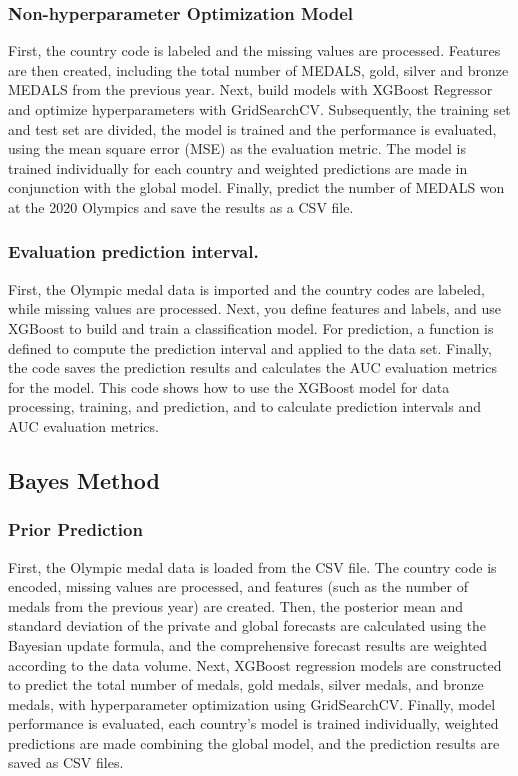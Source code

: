 \documentclass{mcmthesis}
\begin{document}
 \subsubsection{Non-hyperparameter Optimization Model} 
 First, the country code is labeled and the missing values are processed. Features are then created, including the total number of MEDALS, gold, silver and bronze MEDALS from the previous year. Next, build models with XGBoost Regressor and optimize hyperparameters with GridSearchCV. Subsequently, the training set and test set are divided, the model is trained and the performance is evaluated, using the mean square error (MSE) as the evaluation metric. The model is trained individually for each country and weighted predictions are made in conjunction with the global model. Finally, predict the number of MEDALS won at the 2020 Olympics and save the results as a CSV file.
 \subsubsection{Evaluation prediction interval.} 
 First, the Olympic medal data is imported and the country codes are labeled, while missing values are processed. Next, you define features and labels, and use XGBoost to build and train a classification model. For prediction, a function is defined to compute the prediction interval and applied to the data set. Finally, the code saves the prediction results and calculates the AUC evaluation metrics for the model. This code shows how to use the XGBoost model for data processing, training, and prediction, and to calculate prediction intervals and AUC evaluation metrics.
 \subsection{Bayes Method} 
 \subsubsection{Prior Prediction} 
 First, the Olympic medal data is loaded from the CSV file. The country code is encoded, missing values are processed, and features (such as the number of medals from the previous year) are created. Then, the posterior mean and standard deviation of the private and global forecasts are calculated using the Bayesian update formula, and the comprehensive forecast results are weighted according to the data volume. Next, XGBoost regression models are constructed to predict the total number of medals, gold medals, silver medals, and bronze medals, with hyperparameter optimization using GridSearchCV. Finally, model performance is evaluated, each country's model is trained individually, weighted predictions are made combining the global model, and the prediction results are saved as CSV files.
\end{document}
